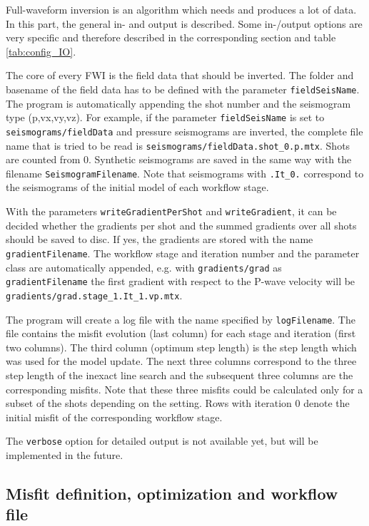 \documentclass[pdftex,a4paper,parskip,listof=totoc,bibliography=totoc,onehalfspacing,12pt]{scrreprt}
\begin{document}
Full-waveform inversion is an algorithm which needs and produces a lot of data. In this part, the general in- and output is described. Some in-/output options are very specific and therefore described in the corresponding section and table \ref{tab:config_IO}.

The core of every FWI is the field data that should be inverted. The folder and basename of the field data has to be defined with the parameter \verb+fieldSeisName+. The program is automatically appending the shot number and the seismogram type (p,vx,vy,vz). For example, if the parameter \verb+fieldSeisName+ is set to \verb+seismograms/fieldData+ and pressure seismograms are inverted, the complete file name that is tried to be read is \verb+seismograms/fieldData.shot_0.p.mtx+. Shots are counted from 0.
Synthetic seismograms are saved in the same way with the filename \verb+SeismogramFilename+. Note that seismograms with \verb+.It_0.+ correspond to the seismograms of the initial model of each workflow stage.

With the parameters \verb+writeGradientPerShot+ and \verb+writeGradient+, it can be decided whether the gradients per shot and the summed gradients over all shots should be saved to disc. If yes, the gradients are stored with the name \verb+gradientFilename+. The workflow stage and iteration number and the parameter class are automatically appended, e.g. with \verb+gradients/grad+ as \verb+gradientFilename+ the first gradient with respect to the P-wave velocity will be \verb+gradients/grad.stage_1.It_1.vp.mtx+.

The program will create a log file with the name specified by \verb+logFilename+. The file contains the misfit evolution (last column) for each stage and iteration (first two columns). The third column (optimum step length) is the step length which was used for the model update. The next three columns correspond to the three step length of the inexact line search and the subsequent three columns are the corresponding misfits. Note that these three misfits could be calculated only for a subset of the shots depending on the setting. Rows with iteration 0 denote the initial misfit of the corresponding workflow stage.

The \verb+verbose+ option for detailed output is not available yet, but will be implemented in the future.

\subsection{Misfit definition, optimization and workflow file}
\end{document}
